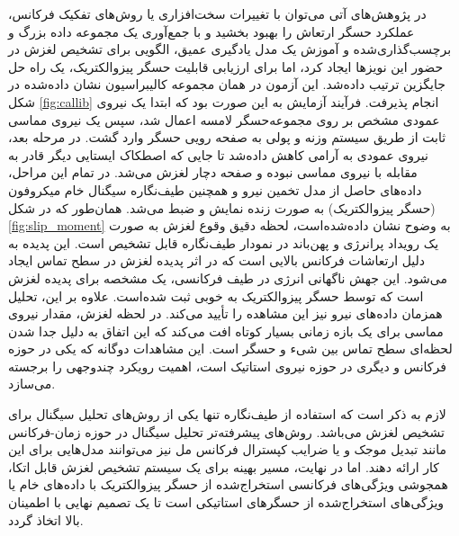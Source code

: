 در پژوهش‌های آتی می‌توان با تغییرات سخت‌افزاری یا روش‌های تفکیک فرکانس، عملکرد حسگر ارتعاش را بهبود بخشید و با جمع‌آوری یک مجموعه داده بزرگ و برچسب‌گذاری‌شده و آموزش یک مدل یادگیری عمیق، الگویی برای تشخیص لغزش در حضور این نویزها ایجاد کرد، اما برای ارزیابی قابلیت حسگر پیزوالکتریک، یک راه حل جایگزین ترتیب داده‌شد. این آزمون در همان مجموعه کالیبراسیون نشان داده‌شده در شکل \ref{fig:callib} انجام پذیرفت. فرآیند آزمایش به این صورت بود که ابتدا یک نیروی عمودی مشخص بر روی مجموعه‌حسگر لامسه اعمال شد، سپس یک نیروی مماسی ثابت از طریق سیستم وزنه و پولی به صفحه رویی حسگر وارد گشت. در مرحله بعد، نیروی عمودی به آرامی کاهش داده‌شد تا جایی که اصطکاک ایستایی دیگر قادر به مقابله با نیروی مماسی نبوده و صفحه دچار لغزش می‌شد.
در تمام این مراحل، داده‌های حاصل از مدل تخمین نیرو و همچنین طیف‌نگاره  سیگنال خام میکروفون (حسگر پیزوالکتریک) به صورت زنده نمایش و ضبط می‌شد. همان‌طور که در شکل \ref{fig:slip_moment} به وضوح نشان داده‌شده‌است، لحظه دقیق وقوع لغزش به صورت یک رویداد پرانرژی و پهن‌باند در نمودار طیف‌نگاره قابل تشخیص است. این پدیده به دلیل ارتعاشات فرکانس بالایی است که در اثر پدیده لغزش در سطح تماس ایجاد می‌شود. این جهش ناگهانی انرژی در طیف فرکانسی، یک مشخصه برای پدیده لغزش است که توسط حسگر پیزوالکتریک به خوبی ثبت شده‌است.
علاوه بر این، تحلیل همزمان داده‌های نیرو نیز این مشاهده را تأیید می‌کند. در لحظه لغزش، مقدار نیروی مماسی برای یک بازه زمانی بسیار کوتاه افت می‌کند که این اتفاق به دلیل جدا شدن لحظه‌ای سطح تماس بین شیء و حسگر است. این مشاهدات دوگانه که یکی در حوزه فرکانس و دیگری در حوزه نیروی استاتیک است، اهمیت رویکرد چندوجهی را برجسته می‌سازد.

لازم به ذکر است که استفاده از طیف‌نگاره تنها یکی از روش‌های تحلیل سیگنال برای تشخیص لغزش می‌باشد. روش‌های پیشرفته‌تر تحلیل سیگنال در حوزه زمان-فرکانس مانند تبدیل موجک
و یا ضرایب کپسترال فرکانس مل 
نیز می‌توانند مدل‌هایی برای این کار ارائه دهند. اما در نهایت، مسیر بهینه برای یک سیستم تشخیص لغزش قابل اتکا، همجوشی ویژگی‌های فرکانسی استخراج‌شده از حسگر پیزوالکتریک با داده‌های خام یا ویژگی‌های استخراج‌شده از حسگرهای استاتیکی است تا یک تصمیم نهایی با اطمینان بالا اتخاذ گردد.




